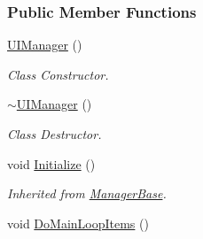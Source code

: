 \subsubsection*{Public Member Functions}
\begin{DoxyCompactItemize}
\item 
\hyperlink{classphys_1_1UIManager_aeb502f11f170efd806b4153923c55359}{UIManager} ()
\begin{DoxyCompactList}\small\item\em Class Constructor. \item\end{DoxyCompactList}\item 
\hyperlink{classphys_1_1UIManager_a203144f08dbaf8068746359c22aa4f1e}{$\sim$UIManager} ()
\begin{DoxyCompactList}\small\item\em Class Destructor. \item\end{DoxyCompactList}\item 
\hypertarget{classphys_1_1UIManager_af04e60c4f09c114ec3bf32babdb64ab7}{
void \hyperlink{classphys_1_1UIManager_af04e60c4f09c114ec3bf32babdb64ab7}{Initialize} ()}
\label{d5/dc5/classphys_1_1UIManager_af04e60c4f09c114ec3bf32babdb64ab7}

\begin{DoxyCompactList}\small\item\em Inherited from \hyperlink{classphys_1_1ManagerBase}{ManagerBase}. \item\end{DoxyCompactList}\item 
\hypertarget{classphys_1_1UIManager_a972abedcd4343dc5966580f2f82494a8}{
void \hyperlink{classphys_1_1UIManager_a972abedcd4343dc5966580f2f82494a8}{DoMainLoopItems} ()}
\label{d5/dc5/classphys_1_1UIManager_a972abedcd4343dc5966580f2f82494a8}


\end{DoxyCompactItemize}
